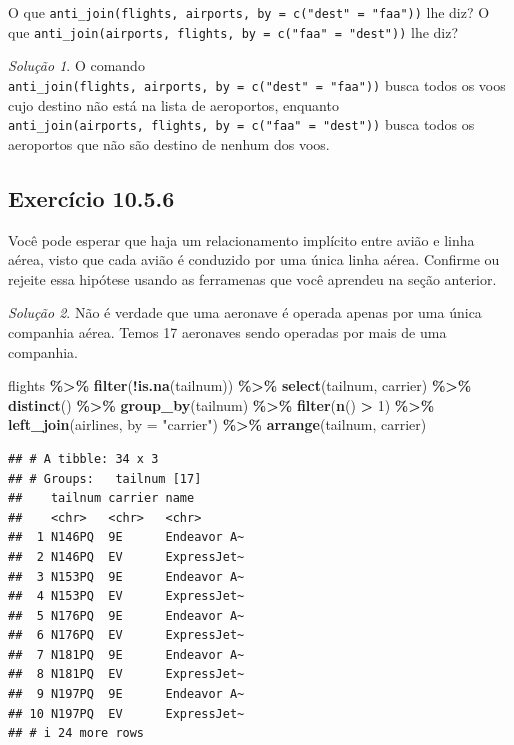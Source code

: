 \documentclass[
]{latex/krantz}
\newenvironment{Shaded}{\begin{snugshade}}{\end{snugshade}}
\newcommand{\AttributeTok}[1]{\textcolor[rgb]{0.13,0.29,0.53}{#1}}
\newcommand{\DecValTok}[1]{\textcolor[rgb]{0.00,0.00,0.81}{#1}}
\newcommand{\FunctionTok}[1]{\textcolor[rgb]{0.13,0.29,0.53}{\textbf{#1}}}
\newcommand{\NormalTok}[1]{#1}
\newcommand{\SpecialCharTok}[1]{\textcolor[rgb]{0.81,0.36,0.00}{\textbf{#1}}}
\newcommand{\StringTok}[1]{\textcolor[rgb]{0.31,0.60,0.02}{#1}}
\theoremstyle{definition}
\theoremstyle{definition}
\theoremstyle{definition}
\theoremstyle{definition}
\theoremstyle{remark}
\newtheorem*{solution}{Solução}
\begin{document}
O que \texttt{anti\_join(flights,\ airports,\ by\ =\ c("dest"\ =\ "faa"))} lhe diz? O que \texttt{anti\_join(airports,\ flights,\ by\ =\ c("faa"\ =\ "dest"))} lhe diz?

\begin{solution}
O comando \texttt{anti\_join(flights,\ airports,\ by\ =\ c("dest"\ =\ "faa"))} busca todos os voos cujo destino não está na lista de aeroportos, enquanto \texttt{anti\_join(airports,\ flights,\ by\ =\ c("faa"\ =\ "dest"))} busca todos os aeroportos que não são destino de nenhum dos voos.
\end{solution}

\hypertarget{exr10-5-6}{%
\subsection*{Exercício 10.5.6}\label{exr10-5-6}}

Você pode esperar que haja um relacionamento implícito entre avião e linha aérea, visto que cada avião é conduzido por uma única linha aérea. Confirme ou rejeite essa hipótese usando as ferramenas que você aprendeu na seção anterior.

\begin{solution}

Não é verdade que uma aeronave é operada apenas por uma única companhia aérea. Temos 17 aeronaves sendo operadas por mais de uma companhia.

\begin{Shaded}
\begin{Highlighting}[]
\NormalTok{flights }\SpecialCharTok{\%\textgreater{}\%}
  \FunctionTok{filter}\NormalTok{(}\SpecialCharTok{!}\FunctionTok{is.na}\NormalTok{(tailnum)) }\SpecialCharTok{\%\textgreater{}\%}
  \FunctionTok{select}\NormalTok{(tailnum, carrier) }\SpecialCharTok{\%\textgreater{}\%}
  \FunctionTok{distinct}\NormalTok{() }\SpecialCharTok{\%\textgreater{}\%}
  \FunctionTok{group\_by}\NormalTok{(tailnum) }\SpecialCharTok{\%\textgreater{}\%}
  \FunctionTok{filter}\NormalTok{(}\FunctionTok{n}\NormalTok{() }\SpecialCharTok{\textgreater{}} \DecValTok{1}\NormalTok{) }\SpecialCharTok{\%\textgreater{}\%}
  \FunctionTok{left\_join}\NormalTok{(airlines, }\AttributeTok{by =} \StringTok{"carrier"}\NormalTok{) }\SpecialCharTok{\%\textgreater{}\%}
  \FunctionTok{arrange}\NormalTok{(tailnum, carrier)}
\end{Highlighting}
\end{Shaded}

\begin{verbatim}
## # A tibble: 34 x 3
## # Groups:   tailnum [17]
##    tailnum carrier name       
##    <chr>   <chr>   <chr>      
##  1 N146PQ  9E      Endeavor A~
##  2 N146PQ  EV      ExpressJet~
##  3 N153PQ  9E      Endeavor A~
##  4 N153PQ  EV      ExpressJet~
##  5 N176PQ  9E      Endeavor A~
##  6 N176PQ  EV      ExpressJet~
##  7 N181PQ  9E      Endeavor A~
##  8 N181PQ  EV      ExpressJet~
##  9 N197PQ  9E      Endeavor A~
## 10 N197PQ  EV      ExpressJet~
## # i 24 more rows
\end{verbatim}

\end{solution}
\end{document}
